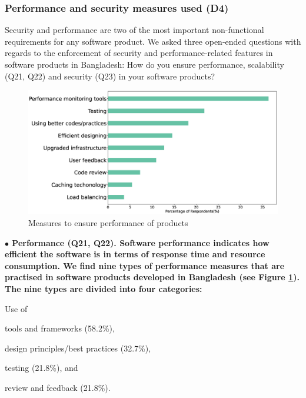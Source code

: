 \subsubsection{Performance and security measures used (D4)}
\label{security_performance}
Security and performance are two of the most important non-functional requirements for any software product. 
We asked three open-ended questions with regards to the enforcement of security and performance-related features in software products in Bangladesh:
How do you ensure performance, scalability (Q21, Q22) and security (Q23) in your software products?




\begin{figure}[h]
\centering
\includegraphics[scale=0.22]{Figures/Performance.eps} 
\caption{Measures to ensure performance of products}
\label{fig:Measures to ensure performance}
\end{figure}
\nd\bf{$\bullet$ Performance (Q21, Q22).} Software performance indicates how efficient the software is in terms of response time and resource consumption. 
We find nine types of performance measures that are practised in software products developed in Bangladesh (see Figure \ref{fig:Measures to ensure performance}).  
The nine types are divided into four categories: 
\begin{inparaenum}
Use of \item tools and frameworks (58.2\%),
\item design principles/best practices (32.7\%),
\item testing (21.8\%), and
\item review and feedback (21.8\%).
\end{inparaenum} 


